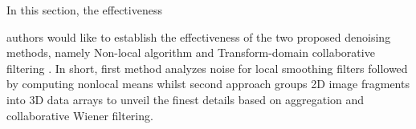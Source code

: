



In this section, the effectiveness 



authors would like to establish the effectiveness of the two proposed denoising methods, namely Non-local algorithm \cite{Buades} and Transform-domain collaborative filtering \cite{dabov2007image}. In short, first method analyzes noise for  local smoothing filters followed by computing nonlocal means whilst second approach groups 2D image fragments into 3D data arrays to unveil the finest details based on aggregation and collaborative Wiener filtering.  
